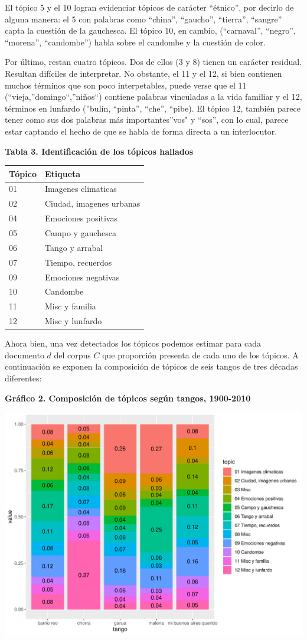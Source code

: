 \documentclass[]{article}
\begin{document}
El tópico 5 y el 10 logran evidenciar tópicos de carácter ``étnico'',
por decirlo de alguna manera: el 5 con palabras como ``china'',
``gaucho'', ``tierra'', ``sangre'' capta la cuestión de la gauchesca. El
tópico 10, en cambio, (``carnaval'', ``negro'', ``morena'',
``candombe'') habla sobre el candombe y la cuestión de color.

Por último, restan cuatro tópicos. Dos de ellos (3 y 8) tienen un
carácter residual. Resultan difíciles de interpretar. No obstante, el 11
y el 12, si bien contienen muchos términos que son poco interpetables,
puede verse que el 11 (``vieja,''domingo``,''niños``) contiene palabras
vinculadas a la vida familiar y el 12, términos en lunfardo (''bulín,
``pinta'', ``che'', ``pibe). El tópico 12, también parece tener como sus
dos palabras más importantes''vos" y ``sos'', con lo cual, parece estar
captando el hecho de que se habla de forma directa a un interlocutor.

\textbf{Tabla 3. Identificación de los tópicos hallados}

\begin{longtable}[]{@{}ll@{}}
\toprule
Tópico & Etiqueta\tabularnewline
\midrule
\endhead
01 & Imagenes climaticas\tabularnewline
02 & Ciudad, imagenes urbanas\tabularnewline
04 & Emociones positivas\tabularnewline
05 & Campo y gauchesca\tabularnewline
06 & Tango y arrabal\tabularnewline
07 & Tiempo, recuerdos\tabularnewline
09 & Emociones negativas\tabularnewline
10 & Candombe\tabularnewline
11 & Misc y familia\tabularnewline
12 & Misc y lunfardo\tabularnewline
\bottomrule
\end{longtable}

Ahora bien, una vez detectados los tópicos podemos estimar para cada
documento \(d\) del corpus \(C\) que proporción presenta de cada uno de
los tópicos. A continuación se exponen la composición de tópicos de seis
tangos de tres décadas diferentes:

\textbf{Gráfico 2. Composición de tópicos según tangos, 1900-2010}

\includegraphics{Notebook_files/figure-latex/unnamed-chunk-3-1.pdf}
\end{document}
